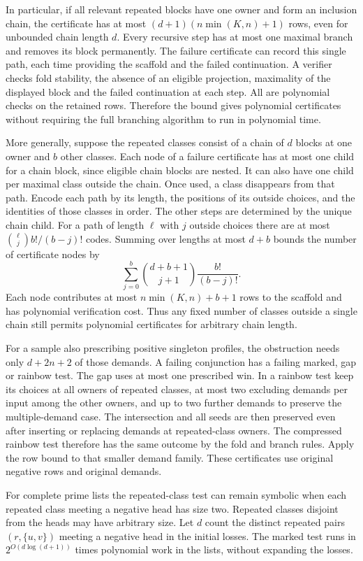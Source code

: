 In particular, if all relevant repeated blocks have
one owner and form an inclusion chain, the certificate
has at most $(d+1)(n\min(K,n)+1)$ rows, even for
unbounded chain length $d$. Every recursive step
has at most one maximal branch and removes its
block permanently. The failure certificate can
record this single path, each time providing the
scaffold and the failed continuation. A verifier
checks fold stability, the absence of an eligible
projection, maximality of the displayed block and
the failed continuation at each step. All are
polynomial checks on the retained rows. Therefore
the bound gives polynomial certificates without
requiring the full branching algorithm to run in
polynomial time.

More generally, suppose the repeated classes consist
of a chain of $d$ blocks at one owner and $b$ other
classes. Each node of a failure certificate has at
most one child for a chain block, since eligible
chain blocks are nested. It can also have one child
per maximal class outside the chain. Once used, a
class disappears from that path. Encode each path
by its length, the positions of its outside choices,
and the identities of those classes in order. The
other steps are determined by the unique chain
child. For a path of length $\ell$ with $j$ outside
choices there are at most
$\binom{\ell}{j}b!/(b-j)!$ codes. Summing over lengths
at most $d+b$ bounds the number of certificate nodes by
\[
 \sum_{j=0}^{b}\binom{d+b+1}{j+1}\frac{b!}{(b-j)!}.
\]
Each node contributes at most $n\min(K,n)+b+1$ rows
to the scaffold and has polynomial verification
cost. Thus any fixed number of classes outside a
single chain still permits polynomial certificates
for arbitrary chain length.

For a sample also prescribing positive
singleton profiles, the obstruction
needs only $d+2n+2$ of those demands.
A failing conjunction has a failing
marked, gap or rainbow test. The gap
uses at most one prescribed win. In a
rainbow test keep its choices at all
owners of repeated classes, at most
two excluding demands per input among
the other owners, and up to two further
demands to preserve the multiple-demand
case. The intersection and all seeds
are then preserved even after inserting
or replacing demands at repeated-class
owners. The compressed rainbow test
therefore has the same outcome by the
fold and branch rules. Apply the row
bound to that smaller demand family.
These certificates use original
negative rows and original demands.

For complete prime lists the repeated-class test can
remain symbolic when each repeated class meeting a
negative head has size two. Repeated classes disjoint
from the heads may have arbitrary size. Let $d$ count
the distinct repeated pairs $(r,\{u,v\})$ meeting
a negative head in the initial losses. The marked
test runs in $2^{O(d\log(d+1))}$ times polynomial
work in the lists, without expanding the losses.

